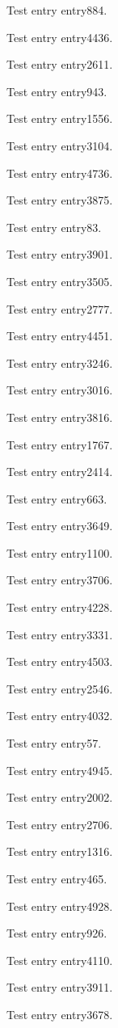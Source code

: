 Test entry \gls{entry884}.

Test entry \gls{entry4436}.

Test entry \gls{entry2611}.

Test entry \gls{entry943}.

Test entry \gls{entry1556}.

Test entry \gls{entry3104}.

Test entry \gls{entry4736}.

Test entry \gls{entry3875}.

Test entry \gls{entry83}.

Test entry \gls{entry3901}.

Test entry \gls{entry3505}.

Test entry \gls{entry2777}.

Test entry \gls{entry4451}.

Test entry \gls{entry3246}.

Test entry \gls{entry3016}.

Test entry \gls{entry3816}.

Test entry \gls{entry1767}.

Test entry \gls{entry2414}.

Test entry \gls{entry663}.

Test entry \gls{entry3649}.

Test entry \gls{entry1100}.

Test entry \gls{entry3706}.

Test entry \gls{entry4228}.

Test entry \gls{entry3331}.

Test entry \gls{entry4503}.

Test entry \gls{entry2546}.

Test entry \gls{entry4032}.

Test entry \gls{entry57}.

Test entry \gls{entry4945}.

Test entry \gls{entry2002}.

Test entry \gls{entry2706}.

Test entry \gls{entry1316}.

Test entry \gls{entry465}.

Test entry \gls{entry4928}.

Test entry \gls{entry926}.

Test entry \gls{entry4110}.

Test entry \gls{entry3911}.

Test entry \gls{entry3678}.

